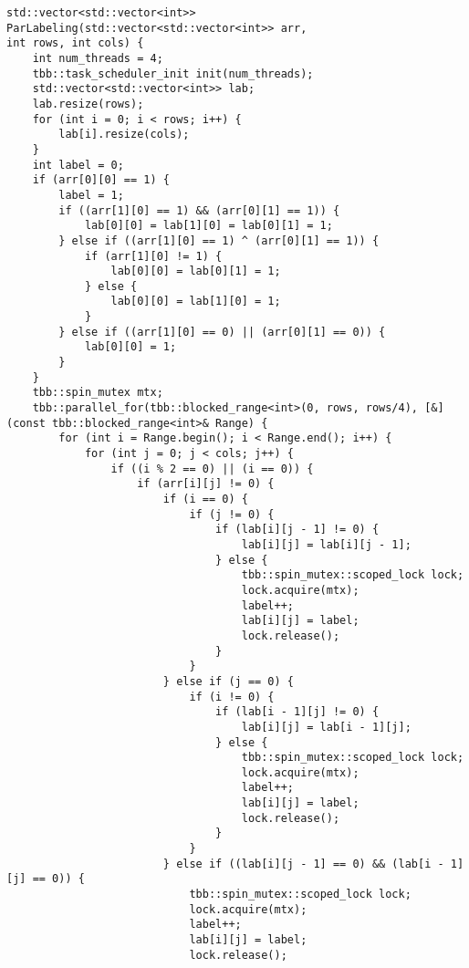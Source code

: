 \documentclass{report}
\begin{document}
\begin{lstlisting}
std::vector<std::vector<int>> ParLabeling(std::vector<std::vector<int>> arr,
int rows, int cols) {
    int num_threads = 4;
    tbb::task_scheduler_init init(num_threads);
    std::vector<std::vector<int>> lab;
    lab.resize(rows);
    for (int i = 0; i < rows; i++) {
        lab[i].resize(cols);
    }
    int label = 0;
    if (arr[0][0] == 1) {
        label = 1;
        if ((arr[1][0] == 1) && (arr[0][1] == 1)) {
            lab[0][0] = lab[1][0] = lab[0][1] = 1;
        } else if ((arr[1][0] == 1) ^ (arr[0][1] == 1)) {
            if (arr[1][0] != 1) {
                lab[0][0] = lab[0][1] = 1;
            } else {
                lab[0][0] = lab[1][0] = 1;
            }
        } else if ((arr[1][0] == 0) || (arr[0][1] == 0)) {
            lab[0][0] = 1;
        }
    }
    tbb::spin_mutex mtx;
    tbb::parallel_for(tbb::blocked_range<int>(0, rows, rows/4), [&](const tbb::blocked_range<int>& Range) {
        for (int i = Range.begin(); i < Range.end(); i++) {
            for (int j = 0; j < cols; j++) {
                if ((i % 2 == 0) || (i == 0)) {
                    if (arr[i][j] != 0) {
                        if (i == 0) {
                            if (j != 0) {
                                if (lab[i][j - 1] != 0) {
                                    lab[i][j] = lab[i][j - 1];
                                } else {
                                    tbb::spin_mutex::scoped_lock lock;
                                    lock.acquire(mtx);
                                    label++;
                                    lab[i][j] = label;
                                    lock.release();
                                }
                            }
                        } else if (j == 0) {
                            if (i != 0) {
                                if (lab[i - 1][j] != 0) {
                                    lab[i][j] = lab[i - 1][j];
                                } else {
                                    tbb::spin_mutex::scoped_lock lock;
                                    lock.acquire(mtx);
                                    label++;
                                    lab[i][j] = label;
                                    lock.release();
                                }
                            }
                        } else if ((lab[i][j - 1] == 0) && (lab[i - 1][j] == 0)) {
                            tbb::spin_mutex::scoped_lock lock;
                            lock.acquire(mtx);
                            label++;
                            lab[i][j] = label;
                            lock.release();

\end{lstlisting}
\end{document}
